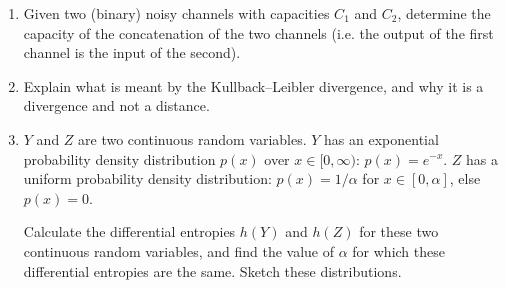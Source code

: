 \documentclass[11pt,a4paper]{article}
\begin{document}
\begin{enumerate}
    \item Given two (binary) noisy channels with capacities $C_1$ and $C_2$, determine the capacity of the concatenation of the two channels (i.e. the output of the first channel is the input of the second).

    \item Explain what is meant by the Kullback–Leibler divergence, and why it is a divergence and not a distance.

    \item $Y$ and $Z$ are two continuous random variables.  
    $Y$ has an exponential probability density distribution $p(x)$ over $x \in [0, \infty)$: $p(x) = e^{-x}$.  
    $Z$ has a uniform probability density distribution: $p(x) = 1/\alpha$ for $x \in [0, \alpha]$, else $p(x) = 0$.  

    Calculate the differential entropies $h(Y)$ and $h(Z)$ for these two continuous random variables, and find the value of $\alpha$ for which these differential entropies are the same.  
    Sketch these distributions.
\end{enumerate}
\end{document}
